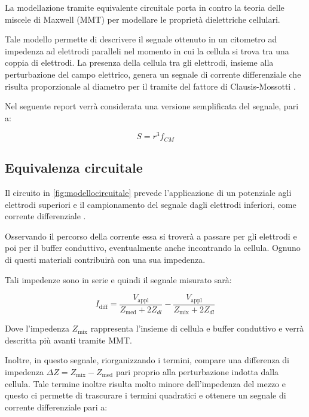 La modellazione tramite equivalente circuitale porta in contro la teoria delle miscele di Maxwell (MMT) per modellare le proprietà dielettriche cellulari.

Tale modello permette di descrivere il segnale ottenuto in un citometro ad impedenza ad elettrodi paralleli nel momento in cui la cellula si trova tra una coppia di elettrodi. La presenza della cellula tra gli elettrodi, insieme alla perturbazione del campo elettrico, genera un segnale di corrente differenziale che risulta proporzionale al diametro per il tramite del fattore di Clausis-Mossotti \cite{bibid}.

Nel seguente report verrà considerata una versione semplificata del segnale, pari a:

\begin{equation}
	S=r^{3} f_{C M}
	\label{eq:signal}
\end{equation}

\subsection{Equivalenza circuitale}

Il circuito in \cref{fig:modellocircuitale} prevede l'applicazione di un potenziale agli elettrodi superiori e il campionamento del segnale dagli elettrodi inferiori, come corrente differenziale \cite{honradoSinglecellMicrofluidicImpedance2021}.

Osservando il percorso della corrente essa si troverà a passare per gli elettrodi e poi per il buffer conduttivo, eventualmente anche incontrando la cellula. Ognuno di questi materiali contribuirà con una sua impedenza.

Tali impedenze sono in serie e quindi il segnale misurato sarà:

\begin{equation}
	I_{\operatorname{d i f f}}=\frac{V_{\operatorname{a p p l}}}{Z_{\operatorname{m e d}}+2 Z_{d l}}-\frac{V_{\operatorname{a p p l}}}{Z_{\operatorname{m i x}}+2 Z_{d l}}
\end{equation}

Dove l'impedenza $Z_{\operatorname{m i x}}$ rappresenta l'insieme di cellula e buffer conduttivo e verrà descritta più avanti tramite MMT.

Inoltre, in questo segnale, riorganizzando i termini, compare una differenza di impedenza $\Delta Z=Z_{\operatorname{m i x}}-Z_{\operatorname{m e d}}$ pari proprio alla perturbazione indotta dalla cellula.  Tale termine inoltre risulta molto minore dell'impedenza del mezzo e questo ci permette di trascurare i termini quadratici e ottenere un segnale di corrente differenziale pari a:


